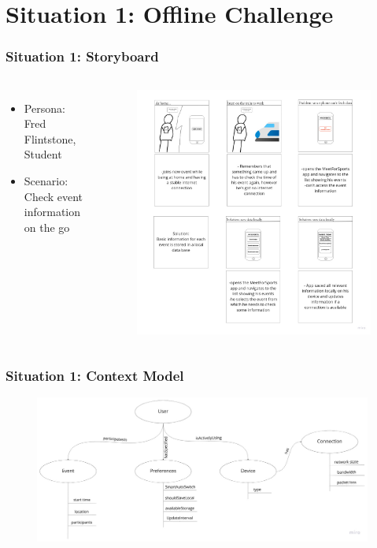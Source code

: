 \documentclass[aspectratio=169]{beamer}
\begin{document}
\section{Situation 1:  Offline Challenge}
\begin{frame}   
	\frametitle{Situation 1:  Storyboard}
	\begin{columns}
		\begin{itemize}
			\item Persona: Fred Flintstone, Student
			\item Scenario: Check event information on the go
		\end{itemize}
		 \begin{figure}
			\centering
			\includegraphics[width=1\textwidth]{media/storyboard1.jpg}
		\end{figure}
	\end{columns}
\end{frame}

\begin{frame}
	\frametitle{Situation 1: Context Model}
	 \begin{figure}
		\centering
		\includegraphics[width=0.99\textwidth]{media/contextmodel1.jpg}
	\end{figure}
\end{frame}
\end{document}
